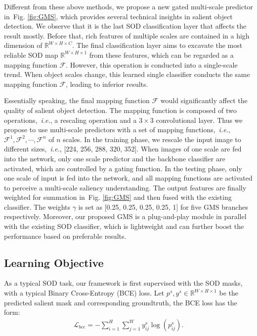 \documentclass[journal]{IEEEtran}
\def\ie{{\em i.e.}}
\newcommand{\figref}[1]{Fig. \ref{#1}}
\newcommand{\mc}[1]{\mathcal{#1}}
\begin{document}
Different from these above methods, we propose a new gated multi-scale predictor in~\figref{fig:GMS}, which provides several technical insights in salient object detection. We observe that it is the last SOD classification layer that affects the result mostly. Before that, rich features of multiple scales are contained in a high dimension of $\mathbb{R}^{W\times H\times C}$. The final classification layer aims to excavate the most reliable SOD map $\mathbb{R}^{W\times H\times 1}$ from these features, which can be regarded as a mapping function $\mc{F}$. However, this operation is conducted into a single-scale trend. When object scales change, this learned single classifier conducts the same mapping function $\mc{F}$, leading to inferior results.

Essentially speaking, the final mapping function $\mc{F}$ would significantly affect the quality of salient object detection. The mapping function is composed of two operations,~\ie, a rescaling operation and a $3\times 3$ convolutional layer.
Thus we propose to use multi-scale predictors with a set of mapping functions,~\ie, $\mc{F}^1,\mc{F}^2,\cdots,\mc{F}^n$ of $n$ scales. In the training phase, we rescale the input image to different sizes,~\ie,  [224, 256, 288, 320, 352]. When images of one scale are fed into the network, only one scale predictor and the backbone classifier are activated, which are controlled by a gating function.  In the testing phase, only one scale of input is fed into the network, and all mapping functions are activated to perceive a multi-scale saliency understanding.
The output features are finally weighted for summation in~\figref{fig:GMS} and then fused with the existing classifier. The weights $\gamma$ is set as [0.25, 0.25, 0.25, 0.25, 1] for five GMS branches respectively.
Moreover, our proposed GMS is a plug-and-play module in parallel with the existing SOD classifier, which is lightweight and can further boost the performance based on preferable results.

















\subsection{Learning Objective}
As a typical SOD task, our framework is first supervised with the SOD masks, with a typical Binary Cross-Entropy (BCE) loss. Let $p^s, y^s \in \mathbb{R}^{W\times H\times 1}$ be the predicted salient mask and corresponding groundtruth, the BCE loss has the form:
\begin{equation}\label{eq:bce}
\begin{split}
\mc{L}_{bce} = -\sum_{i=1}^{H}\sum_{j=1}^{W}y^s_{ij}\log(p^s_{ij}).
\end{split}
\end{equation}
\end{document}
